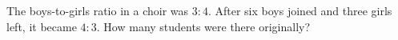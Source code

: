 The boys-to-girls ratio in a choir was $3:4$. After six boys joined and three girls left, it became $4:3$. How many students were there originally?
